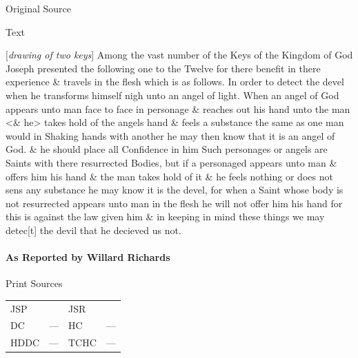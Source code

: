 				\begin{description}
					\item[Original Source]
				\end{description}

				
				\begin{description}
					\item[Text]
				\end{description}
				
					[\textit{drawing of two keys}] Among the vast number of the Keys of the Kingdom of God Joseph presented the following one to the Twelve for there benefit in there experience \& travels in the flesh which is as follows. In order to detect the devel when he transforms himself nigh unto an angel of light. When an angel of God appears unto man face to face in personage \& reaches out his hand unto the man <\& he> takes hold of the angels hand \& feels a substance the same as one man would in Shaking hands with another he may then know that it is an angel of God. \& he should place all Confidence in him Such personages or angels are Saints with there resurrected Bodies, but if a personaged appears unto man \& offers him his hand \& the man takes hold of it \& he feels nothing or does not sens any substance he may know it is the devel, for when a Saint whose body is not resurrected appears unto man in the flesh he will not offer him his hand for this is against the law given him \& in keeping in mind these things we may detec[t] the devil that he decieved us not.
				
			\paragraph{As Reported by Willard Richards}
				\label{EMS-1839-JS-27-JUN-1839-WR}
				
				\begin{description}
					\item[Print Sources]
				\end{description}

					\begin{tabular}{p{0.5in}p{1in}p{0.5in}p{1in}}
					JSP	 	& 			& JSR 		&  \\
					DC	 	& ---		& HC 		& --- \\
					HDDC 	& ---		& TCHC 		& --- \\
					\end{tabular}
				
